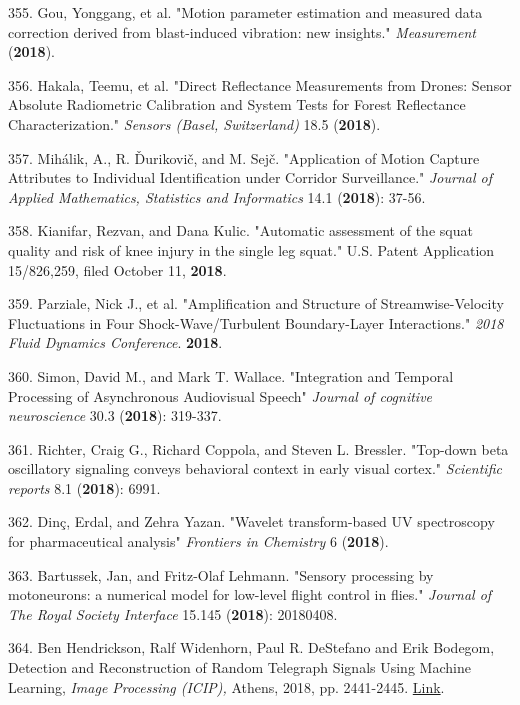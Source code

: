 355. Gou, Yonggang, et al. "Motion parameter estimation and measured data correction derived from blast-induced vibration: new insights." \textit{Measurement} (\textbf{2018}).

356. Hakala, Teemu, et al. "Direct Reflectance Measurements from Drones: Sensor Absolute Radiometric Calibration and System Tests for Forest Reflectance Characterization." \textit{Sensors (Basel, Switzerland)} 18.5 (\textbf{2018}).

357. Mih\'{a}lik, A., R. \v{D}urikovi\v{c}, and M. Sej\v{c}. "Application of Motion Capture Attributes to Individual Identification under Corridor Surveillance." \textit{Journal of Applied Mathematics, Statistics and Informatics} 14.1 (\textbf{2018}): 37-56.

358. Kianifar, Rezvan, and Dana Kulic. "Automatic assessment of the squat quality and risk of knee injury in the single leg squat." U.S. Patent Application 15/826,259, filed October 11, \textbf{2018}.

359. Parziale, Nick J., et al. "Amplification and Structure of Streamwise-Velocity Fluctuations in Four Shock-Wave/Turbulent Boundary-Layer Interactions." \textit{2018 Fluid Dynamics Conference}. \textbf{2018}.

360. Simon, David M., and Mark T. Wallace. "Integration and Temporal Processing of Asynchronous Audiovisual Speech" \textit{Journal of cognitive neuroscience} 30.3 (\textbf{2018}): 319-337.

361. Richter, Craig G., Richard Coppola, and Steven L. Bressler. "Top-down beta oscillatory signaling conveys behavioral context in early visual cortex." \textit{Scientific reports} 8.1 (\textbf{2018}): 6991.

362. Din\c{c}, Erdal, and Zehra Yazan. "Wavelet transform-based UV spectroscopy for pharmaceutical analysis" \textit{Frontiers in Chemistry} 6 (\textbf{2018}).

363. Bartussek, Jan, and Fritz-Olaf Lehmann. "Sensory processing by motoneurons: a numerical model for low-level flight control in flies." \textit{Journal of The Royal Society Interface} 15.145 (\textbf{2018}): 20180408.

364. Ben Hendrickson, Ralf Widenhorn, Paul R. DeStefano and Erik Bodegom, Detection and Reconstruction of Random Telegraph Signals Using Machine Learning, \textit{Image Processing (ICIP),} Athens, 2018, pp. 2441-2445. \href{https://static1.squarespace.com/static/5cc5cf7eda50d357e986b6f0/t/5cddf6dc4d9e75000152d53a/1558050526419/ML+IEEE+Hendrickson.pdf}{Link}.

